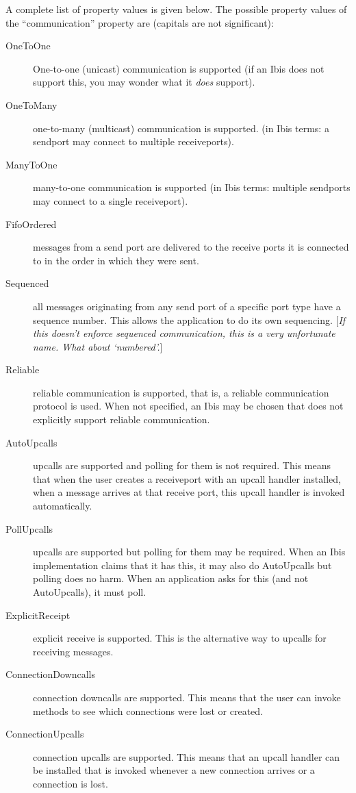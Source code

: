 \documentclass[10pt]{article}
\newcommand{\remark}[1]{[\emph{#1}]}
\begin{document}
A complete list of property values is given below.
The possible property values of the ``communication'' property are
(capitals are not significant):
\begin{description}
\item[OneToOne]
One-to-one (unicast) communication is supported (if an Ibis does not support
this, you may wonder what it \emph{does} support).
\item[OneToMany]
one-to-many (multicast) communication is supported.
(in Ibis terms: a sendport
may connect to multiple receiveports).
\item[ManyToOne]
many-to-one communication is supported (in Ibis terms: multiple
sendports may connect to a single receiveport).
\item[FifoOrdered]
messages from a send port are delivered to the receive ports it is
connected to in the order in which they were sent.
\item[Sequenced]
all messages originating from any send port of a specific port type have
a sequence number. This allows the application to do its own sequencing.
\remark{If this doesn't enforce sequenced communication, this is a very
unfortunate name. What about `numbered'.}
\item[Reliable]
reliable communication is supported, that is,
a reliable communication protocol is used.
When not specified, an Ibis may be chosen that does not explicitly
support reliable communication.
\item[AutoUpcalls]
upcalls are supported and polling for them is not required.
This means that when the user creates a receiveport with an upcall
handler installed, when a message arrives at that receive port, 
this upcall handler is invoked automatically.
\item[PollUpcalls]
upcalls are supported but polling for them may be required. When an
Ibis implementation claims that it has this, it may also do
AutoUpcalls but polling does no harm. When an application asks for
this (and not AutoUpcalls), it must poll.
\item[ExplicitReceipt]
explicit receive is supported.
This is the alternative way to upcalls for receiving messages.
\item[ConnectionDowncalls]
connection downcalls are supported. This means that the user can
invoke methods to see which connections were lost or created.
\item[ConnectionUpcalls]
connection upcalls are supported. This means that an upcall
handler can be installed that is invoked whenever a new connection arrives
or a connection is lost.
\end{description}
\end{document}
